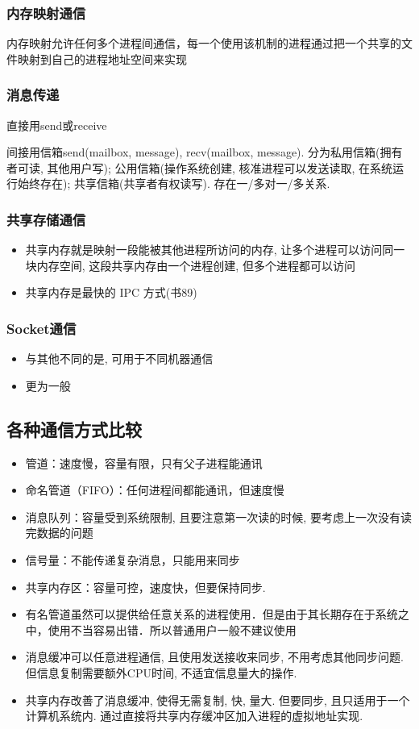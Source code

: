 \documentclass[a4paper, UTF8]{article}
\begin{document}
\subsubsection{内存映射通信}
内存映射允许任何多个进程间通信，每一个使用该机制的进程通过把一个共享的文件映射到自己的进程地址空间来实现
\subsubsection{消息传递}
直接用send或receive\par
间接用信箱send(mailbox, message), recv(mailbox, message). 分为私用信箱(拥有者可读, 其他用户写); 公用信箱(操作系统创建, 核准进程可以发送读取, 在系统运行始终存在); 共享信箱(共享者有权读写). 存在一/多对一/多关系.
\subsubsection{共享存储通信}
\begin{itemize}
\item 共享内存就是映射一段能被其他进程所访问的内存, 让多个进程可以访问同一块内存空间, 这段共享内存由一个进程创建, 但多个进程都可以访问
\item 共享内存是最快的 IPC 方式(书89)
\end{itemize}
\subsubsection{Socket通信}
\begin{itemize}
\item 与其他不同的是, 可用于不同机器通信
\item 更为一般
\end{itemize}
\subsection{各种通信方式比较}
\begin{itemize}
\item 管道：速度慢，容量有限，只有父子进程能通讯
\item 命名管道（FIFO）：任何进程间都能通讯，但速度慢
\item 消息队列：容量受到系统限制, 且要注意第一次读的时候, 要考虑上一次没有读完数据的问题
\item 信号量：不能传递复杂消息，只能用来同步
\item 共享内存区：容量可控，速度快，但要保持同步.
\item 有名管道虽然可以提供给任意关系的进程使用．但是由于其长期存在于系统之中，使用不当容易出错．所以普通用户一般不建议使用
\item 消息缓冲可以任意进程通信, 且使用发送接收来同步, 不用考虑其他同步问题. 但信息复制需要额外CPU时间, 不适宜信息量大的操作.
\item 共享内存改善了消息缓冲, 使得无需复制, 快, 量大. 但要同步, 且只适用于一个计算机系统内. 通过直接将共享内存缓冲区加入进程的虚拟地址实现.
\end{itemize}
\newpage
\end{document}
